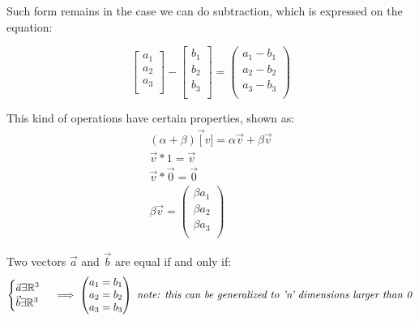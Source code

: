 \documentclass[11pt,fleqn]{book} %
\begin{document}
Such form remains in the case we can do subtraction, which is expressed on the equation:

\begin{equation}
    \begin{bmatrix}
        a_1 \\
        a_2 \\
        a_3 \\
    \end{bmatrix}
    -
    \begin{bmatrix}
        b_1 \\
        b_2 \\
        b_3 \\
    \end{bmatrix}
    = 
    \begin{pmatrix}
        a_1 - b_1\\
        a_2 - b_2\\
        a_3 - b_3\\
    \end{pmatrix}
\end{equation}

This kind of operations have certain properties, shown as:
\begin{gather}
    (\alpha + \beta)\vec[v] = \alpha\vec{v} + \beta\vec{v} \\
    \vec{v} * 1 = \vec{v} \\
    \vec{v} * \vec{0} = \vec{0} \\
    \beta \vec{v} = 
    \begin{pmatrix}
        \beta a_1\\
        \beta a_2\\
        \beta a_3\\
    \end{pmatrix}
\end{gather}

Two vectors $ \vec{a} $ and $ \vec{b} $ are equal if and only if:
\begin{equation}
    \begin{cases}
        \vec{a} \exists \mathbb{R}^3 \\
        \vec{b} \exists \mathbb{R}^3
    \end{cases}
    \implies
    \begin{pmatrix}
        a_1 = b_1\\
        a_2 = b_2\\
        a_3 = b_3\\
    \end{pmatrix}
    \text{
        \textit{note: this can be generalized to 'n' dimensions larger than 0}}
\end{equation}
\end{document}
